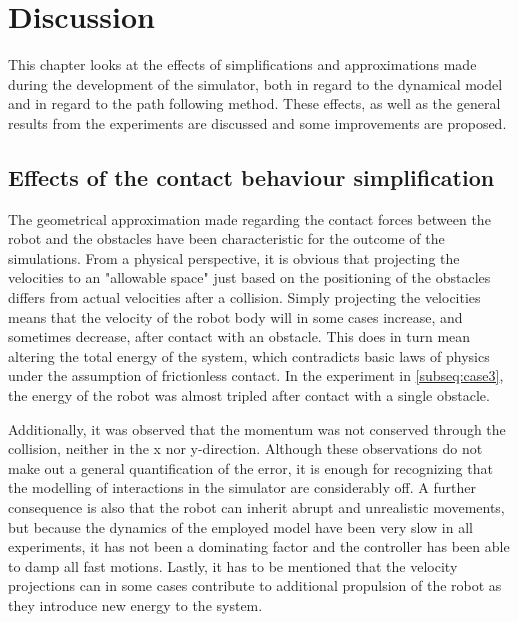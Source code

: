 \chapter{Discussion} \label{ch:discussion}

This chapter looks at the effects of simplifications and approximations made during the development of the simulator, both in regard to the dynamical model and in regard to the path following method. These effects, as well as the general results from the experiments are discussed and some improvements are proposed.

\section{Effects of the contact behaviour simplification}

The geometrical approximation made regarding the contact forces between the robot and the obstacles have been characteristic for the outcome of the simulations.
From a physical perspective, it is obvious that projecting the velocities to an "allowable space" just based on the positioning of the obstacles differs from actual velocities after a collision. Simply projecting the velocities means that the velocity of the robot body will in some cases increase, and sometimes decrease, after contact with an obstacle. This does in turn mean altering the total energy of the system, which contradicts basic laws of physics under the assumption of frictionless contact. In the experiment in \ref{subseq:case3}, the energy of the robot was almost tripled after contact with a single obstacle.

Additionally, it was observed that the momentum was not conserved through the collision, neither in the x nor y-direction.
Although these observations do not make out a general quantification of the error, it is enough for recognizing that the modelling of interactions in the simulator are considerably off. A further consequence is also that the robot can inherit abrupt and unrealistic movements, but because the dynamics of the employed model have been very slow in all experiments, it has not been a dominating factor and the controller has been able to damp all fast motions. Lastly, it has to be mentioned that the velocity projections can in some cases contribute to additional propulsion of the robot as they introduce new energy to the system.

